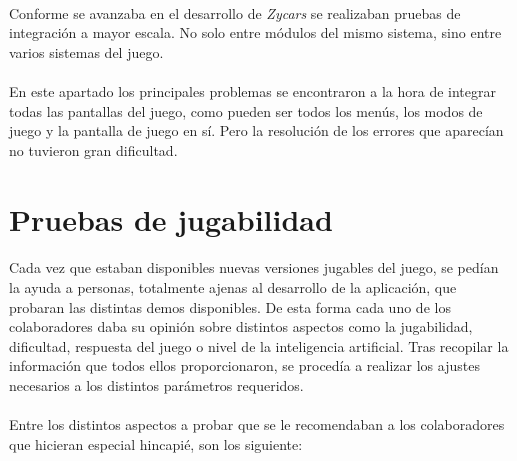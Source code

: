 \paragraph{}
Conforme se avanzaba en el desarrollo de \emph{Zycars} se realizaban pruebas de integración a mayor escala. No solo entre módulos
del mismo sistema, sino entre varios sistemas del juego.

\paragraph{}
En este apartado los principales problemas se encontraron a la hora de integrar todas las pantallas del juego, como pueden ser todos
los menús, los modos de juego y la pantalla de juego en sí. Pero la resolución
de los errores que aparecían no tuvieron gran 
dificultad.

\section{Pruebas de jugabilidad}

\paragraph{}
Cada vez que estaban disponibles nuevas versiones jugables del juego, se pedían la ayuda a personas, totalmente ajenas al desarrollo
de la aplicación, que probaran las distintas demos disponibles. De esta forma cada uno de los colaboradores daba su opinión sobre
distintos aspectos como la jugabilidad, dificultad, respuesta del juego o nivel de la inteligencia artificial. Tras recopilar la
información que todos ellos proporcionaron, se procedía a realizar los ajustes
necesarios a los distintos parámetros requeridos.

\paragraph{}
Entre los distintos aspectos a probar que se le recomendaban a los
colaboradores que hicieran especial hincapié, son los siguiente:


